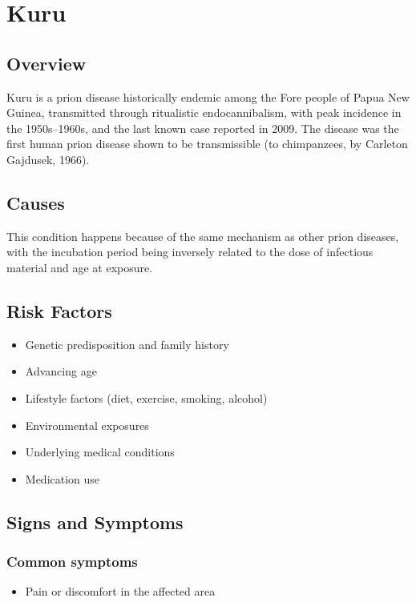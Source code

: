 \chapter{Kuru}
\label{sec:Kuru}

\section{Overview}
Kuru is a prion disease historically endemic among the Fore people of Papua New Guinea, transmitted through ritualistic endocannibalism, with peak incidence in the 1950s--1960s, and the last known case reported in 2009. The disease was the first human prion disease shown to be transmissible (to chimpanzees, by Carleton Gajdusek, 1966).
\section{Causes}
This condition happens because of the same mechanism as other prion diseases, with the incubation period being inversely related to the dose of infectious material and age at exposure.     
\section{Risk Factors}

\begin{itemize}[noitemsep]
  \item Genetic predisposition and family history
  \item Advancing age
  \item Lifestyle factors (diet, exercise, smoking, alcohol)
  \item Environmental exposures
  \item Underlying medical conditions
  \item Medication use
\end{itemize}
\section{Signs and Symptoms}

\subsection{Common symptoms}
\begin{itemize}[noitemsep]
  \item Pain or discomfort in the affected area
  \end{itemize}

